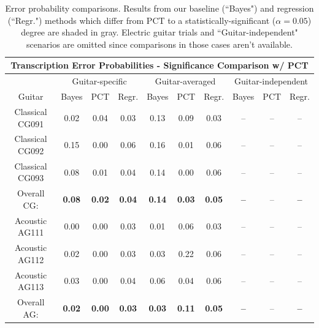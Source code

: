 \documentclass[12pt]{cmuthesis}
\begin{document}
\begin{table}[!htbp]
\begin{center}
\begin{tabular} {||c||c|c|c||c|c|c||c|c|c||}
\hline
\multicolumn{10}{||c||}{\bf{Transcription Error Probabilities - Significance Comparison w/ PCT}} \\
\hline
 & \multicolumn{3}{|c||}{Guitar-specific} & \multicolumn{3}{|c||}{Guitar-averaged}& \multicolumn{3}{|c||}{Guitar-independent}\\
\hline
Guitar & Bayes & PCT & Regr. & Bayes & PCT & Regr. & Bayes & PCT & Regr.\\
\hline
\hline
Classical CG091 & 0.02 & 0.04 & 0.03 & 0.13 & 0.09 & 0.03 & -- & -- & -- \\
\hline
Classical CG092 & 0.15 & 0.00 & 0.06 & 0.16 & 0.01 & 0.06 & -- & -- & -- \\
\hline
Classical CG093 & 0.08 & 0.01 & 0.04 & \cellcolor[gray]{0.8}0.14 & 0.00 & 0.06 & -- & -- & -- \\
\hline
Overall CG: & \bf{0.08} & \bf{0.02}  & \bf{0.04} & \bf{0.14} & \bf{0.03} & \bf{0.05} & \bf{--} & -- & \bf{--}\\
\hline
\hline
Acoustic AG111 & 0.00 & 0.00 & 0.03 & 0.01 & 0.06 & 0.03 & -- & -- & -- \\
\hline
Acoustic AG112 & 0.02 & 0.00 & 0.03 & 0.03 & 0.22 & 0.06 & -- & -- & -- \\
\hline
Acoustic AG113  & 0.03 & 0.00 & 0.04 & 0.06 & 0.04 & 0.06 & -- & -- & --\\
\hline
Overall AG: & \bf{0.02} & \bf{0.00} & \bf{0.03} & \bf{0.03} & \bf{0.11} & \bf{0.05} & \bf{--} & -- & \bf{--}\\
\hline
\hline
\end{tabular}
\caption{Error probability comparisons. Results from our baseline (``Bayes") and regression (``Regr.") methods which differ from PCT to a statistically-significant ($\alpha=0.05$) degree are shaded in gray. Electric guitar trials and ``Guitar-independent" scenarios are omitted since comparisons in those cases aren't available.}
\label{tab:ttest-RWC}
\end{center}
\end{table}
\end{document}
